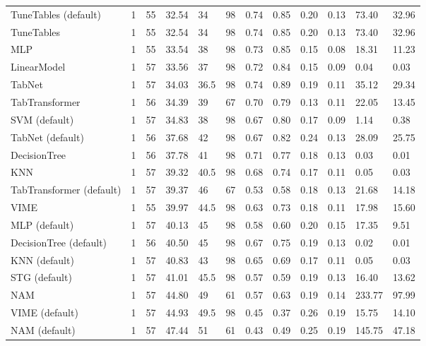 \begin{tabular}{lllllrllllll}
TuneTables (default) & 1 & 55 & 32.54 & 34 & 98 & 0.74 & 0.85 & 0.20 & 0.13 & 73.40 & 32.96 \\
TuneTables & 1 & 55 & 32.54 & 34 & 98 & 0.74 & 0.85 & 0.20 & 0.13 & 73.40 & 32.96 \\
MLP & 1 & 55 & 33.54 & 38 & 98 & 0.73 & 0.85 & 0.15 & 0.08 & 18.31 & 11.23 \\
LinearModel & 1 & 57 & 33.56 & 37 & 98 & 0.72 & 0.84 & 0.15 & 0.09 & 0.04 & 0.03 \\
TabNet & 1 & 57 & 34.03 & 36.5 & 98 & 0.74 & 0.89 & 0.19 & 0.11 & 35.12 & 29.34 \\
TabTransformer & 1 & 56 & 34.39 & 39 & 67 & 0.70 & 0.79 & 0.13 & 0.11 & 22.05 & 13.45 \\
SVM (default) & 1 & 57 & 34.83 & 38 & 98 & 0.67 & 0.80 & 0.17 & 0.09 & 1.14 & 0.38 \\
TabNet (default) & 1 & 56 & 37.68 & 42 & 98 & 0.67 & 0.82 & 0.24 & 0.13 & 28.09 & 25.75 \\
DecisionTree & 1 & 56 & 37.78 & 41 & 98 & 0.71 & 0.77 & 0.18 & 0.13 & 0.03 & 0.01 \\
KNN & 1 & 57 & 39.32 & 40.5 & 98 & 0.68 & 0.74 & 0.17 & 0.11 & 0.05 & 0.03 \\
TabTransformer (default) & 1 & 57 & 39.37 & 46 & 67 & 0.53 & 0.58 & 0.18 & 0.13 & 21.68 & 14.18 \\
VIME & 1 & 55 & 39.97 & 44.5 & 98 & 0.63 & 0.73 & 0.18 & 0.11 & 17.98 & 15.60 \\
MLP (default) & 1 & 57 & 40.13 & 45 & 98 & 0.58 & 0.60 & 0.20 & 0.15 & 17.35 & 9.51 \\
DecisionTree (default) & 1 & 56 & 40.50 & 45 & 98 & 0.67 & 0.75 & 0.19 & 0.13 & 0.02 & 0.01 \\
KNN (default) & 1 & 57 & 40.83 & 43 & 98 & 0.65 & 0.69 & 0.17 & 0.11 & 0.05 & 0.03 \\
STG (default) & 1 & 57 & 41.01 & 45.5 & 98 & 0.57 & 0.59 & 0.19 & 0.13 & 16.40 & 13.62 \\
NAM & 1 & 57 & 44.80 & 49 & 61 & 0.57 & 0.63 & 0.19 & 0.14 & 233.77 & 97.99 \\
VIME (default) & 1 & 57 & 44.93 & 49.5 & 98 & 0.45 & 0.37 & 0.26 & 0.19 & 15.75 & 14.10 \\
NAM (default) & 1 & 57 & 47.44 & 51 & 61 & 0.43 & 0.49 & 0.25 & 0.19 & 145.75 & 47.18 \\
\bottomrule
\end{tabular}
